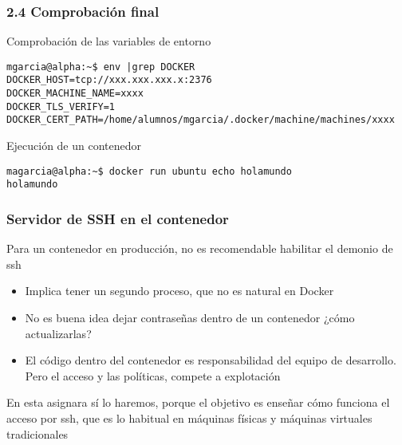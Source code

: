 \documentclass[ucs]{beamer}
\begin{document}
\begin{frame}[fragile]
\frametitle{2.4 Comprobación final}

Comprobación de las variables de entorno

  \begin{scriptsize}
  \begin{verbatim}
mgarcia@alpha:~$ env |grep DOCKER
DOCKER_HOST=tcp://xxx.xxx.xxx.x:2376
DOCKER_MACHINE_NAME=xxxx 
DOCKER_TLS_VERIFY=1
DOCKER_CERT_PATH=/home/alumnos/mgarcia/.docker/machine/machines/xxxx
  \end{verbatim}
  \end{scriptsize}


Ejecución de un contenedor


  \begin{scriptsize}
  \begin{verbatim}
magarcia@alpha:~$ docker run ubuntu echo holamundo
holamundo
  \end{verbatim}
  \end{scriptsize}


\end{frame}




\begin{frame}[fragile]
\frametitle{Servidor de SSH en el contenedor}
Para un contenedor en producción, no es recomendable habilitar 
el demonio de ssh
\begin{itemize}
\item
Implica tener un segundo proceso, que no es natural en Docker

\item
No es buena idea dejar contraseñas dentro de un contenedor
¿cómo actualizarlas?

\item
El código dentro del contenedor es responsabilidad del equipo de desarrollo.
Pero el acceso y las políticas, compete a explotación
\end{itemize}


En esta asignara sí lo haremos, porque el objetivo es enseñar
cómo funciona el acceso por ssh, que es lo habitual en máquinas
físicas y máquinas virtuales tradicionales


\end{frame}
\end{document}
